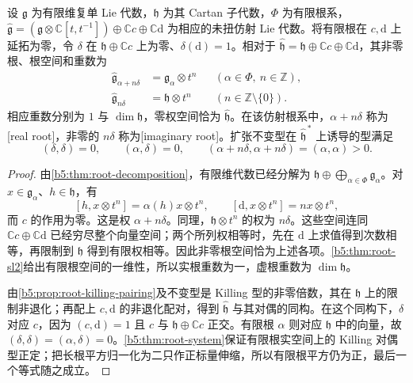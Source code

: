 \begin{theorem}\label{b5:thm:G-affine-root-decomposition}
	设 \(\mathfrak g\) 为有限维复单 Lie 代数，\(\mathfrak h\) 为其 Cartan 子代数，\(\Phi\) 为有限根系，\(\widehat{\mathfrak g}=(\mathfrak g\otimes\mathbb C[t,t^{-1}])\oplus\mathbb Cc\oplus\mathbb C\mathrm d\) 为相应的未扭仿射 Lie 代数。将有限根在 \(c,\mathrm d\) 上延拓为零，令 \(\delta\) 在 \(\mathfrak h\oplus\mathbb Cc\) 上为零、\(\delta(\mathrm d)=1\)。相对于 \(\widehat{\mathfrak h}=\mathfrak h\oplus\mathbb Cc\oplus\mathbb C\mathrm d\)，其非零根、根空间和重数为
	\[
		\begin{aligned}
			\widehat{\mathfrak g}_{\alpha+n\delta}
			&=\mathfrak g_\alpha\otimes t^n
			&& (\alpha\in\Phi,\ n\in\mathbb Z),\\
			\widehat{\mathfrak g}_{n\delta}
			&=\mathfrak h\otimes t^n
			&& (n\in\mathbb Z\setminus\{0\}).
		\end{aligned}
	\]
	相应重数分别为 \(1\) 与 \(\dim\mathfrak h\)，零权空间恰为 \(\widehat{\mathfrak h}\)。在该仿射根系中，\(\alpha+n\delta\) 称为[real root]，非零的 \(n\delta\) 称为[imaginary root]。扩张不变型在 \(\widehat{\mathfrak h}^{\,*}\) 上诱导的型满足
	\[
		(\delta,\delta)=0,\qquad(\alpha,\delta)=0,\qquad
		(\alpha+n\delta,\alpha+n\delta)=(\alpha,\alpha)>0.
	\]
\end{theorem}
\begin{proof}
	由\cref{b5:thm:root-decomposition}，有限维代数已经分解为 \(\mathfrak h\oplus\bigoplus_{\alpha\in\Phi}\mathfrak g_\alpha\)。对 \(x\in\mathfrak g_\alpha\)、\(h\in\mathfrak h\)，有
	\[
		[h,x\otimes t^n]=\alpha(h)x\otimes t^n,\qquad
		[\mathrm d,x\otimes t^n]=nx\otimes t^n,
	\]
	而 \(c\) 的作用为零。这是权 \(\alpha+n\delta\)。同理，\(\mathfrak h\otimes t^n\) 的权为 \(n\delta\)。这些空间连同 \(\mathbb Cc\oplus\mathbb C\mathrm d\) 已经穷尽整个向量空间；两个所列权相等时，先在 \(\mathrm d\) 上求值得到次数相等，再限制到 \(\mathfrak h\) 得到有限权相等。因此非零根空间恰为上述各项。\cref{b5:thm:root-sl2}给出有限根空间的一维性，所以实根重数为一，虚根重数为 \(\dim\mathfrak h\)。

	由\cref{b5:prop:root-killing-pairing}及不变型是 Killing 型的非零倍数，其在 \(\mathfrak h\) 上的限制非退化；再配上 \(c,\mathrm d\) 的非退化配对，得到 \(\widehat{\mathfrak h}\) 与其对偶的同构。在这个同构下，\(\delta\) 对应 \(c\)，因为 \((c,\mathrm d)=1\) 且 \(c\) 与 \(\mathfrak h\oplus\mathbb Cc\) 正交。有限根 \(\alpha\) 则对应 \(\mathfrak h\) 中的向量，故 \((\delta,\delta)=(\alpha,\delta)=0\)。\cref{b5:thm:root-system}保证有限根实空间上的 Killing 对偶型正定；把长根平方归一化为二只作正标量伸缩，所以有限根平方仍为正，最后一个等式随之成立。
\end{proof}

